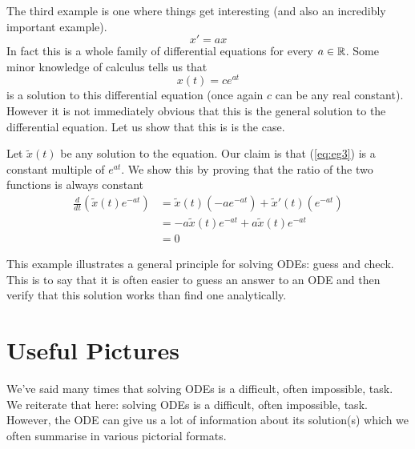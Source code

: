 The third example is one where things get interesting (and also an incredibly important example).
\begin{equation}\label{eq:eg3}
    x' = ax
\end{equation}
In fact this is a whole family of differential equations for every $a \in \mathbb{R}$. Some minor knowledge of calculus tells us that
$$ x(t) = ce^{at} $$
is a solution to this differential equation (once again $c$ can be any real constant). However it is not immediately obvious that this is the general solution to the differential equation. Let us show that this is is the case.

Let $\tilde{x}(t)$ be any solution to the equation. Our claim is that (\ref*{eq:eg3}) is a constant multiple of $e^{at}$. We show this by proving that the ratio of the two functions is always constant
\begin{align*}
    \frac{d}{dt}(\tilde{x}(t) e^{-at}) &= \tilde{x}(t)(-a e^{-at}) + \tilde{x}'(t)(e^{-at})\\
    &= -a \tilde{x}(t) e^{-at} + a \tilde{x}(t) e^{-at}\\
    &= 0
\end{align*}

This example illustrates a general principle for solving ODEs: guess and check. This is to say that it is often easier to guess an answer to an ODE and then verify that this solution works than find one analytically. 

\section{Useful Pictures}
We've said many times that solving ODEs is a difficult, often impossible, task. We reiterate that here: solving ODEs is a difficult, often impossible, task. However, the ODE can give us a lot of information about its solution(s) which we often summarise in various pictorial formats.

